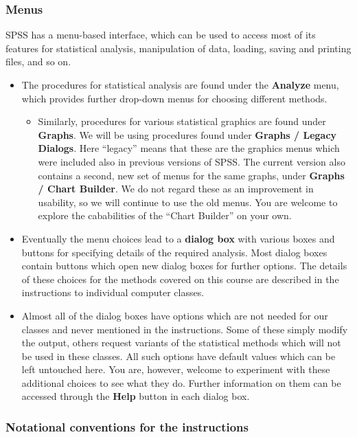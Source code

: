 \subsubsection{Menus}

SPSS has a menu-based interface, which can be used to access most of its
features for statistical analysis, manipulation of data, loading, saving
and printing files, and so on.
\begin{itemize}
\item
The procedures for statistical analysis are found under the
\textbf{Analyze} menu, which provides further drop-down menus for
choosing different methods.
\begin{itemize}
\item
Similarly, procedures for various
statistical graphics are found under \textbf{Graphs}.
We will be using procedures found under \textbf{Graphs / Legacy
Dialogs}. Here ``legacy'' means that these are the graphics menus which
were included also in previous versions of SPSS.
The current version also contains a second, new set of menus for the
same graphs, under \textbf{Graphs / Chart Builder}. We do not regard
these as an improvement in usability, so we will continue to use the old
menus. You are welcome to explore the cababilities of the ``Chart
Builder'' on your own.
\end{itemize}
\item
Eventually the menu choices lead to a \textbf{dialog box} with various
boxes and buttons for specifying details of the required analysis. Most
dialog boxes contain buttons which open new dialog boxes for further
options. The details of these choices for the methods covered on this
course are described in the instructions to individual computer classes.
\item
Almost all of the dialog boxes have options which are not needed for our
classes and never mentioned in the instructions. Some of these simply
modify the output, others request variants of the statistical methods
which will not be used in these
classes. All such options have default values which can be left
untouched here. You are, however, welcome to
experiment with these additional choices to see what they do. Further
information on them can be accessed through the \textbf{Help} button in
each dialog box.
\end{itemize}


\subsubsection{Notational conventions for the instructions}


